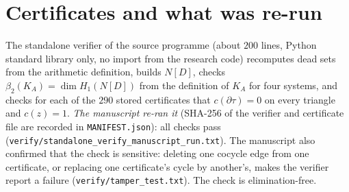 \section{Certificates and what was re-run}\label{sec:certificates}
The standalone verifier of the source programme (about $200$ lines, Python standard library only, no import from the research code) recomputes dead sets from the arithmetic definition, builds $N[D]$, checks $\beta_2(K_A)=\dim H_1(N[D])$ from the definition of $K_A$ for four systems, and checks for each of the $290$ stored certificates that $c(\partial\tau)=0$ on every triangle and $c(z)=1$. \emph{The manuscript re-ran it} (SHA-256 of the verifier and certificate file are recorded in \texttt{MANIFEST.json}): all checks pass (\texttt{verify/standalone\_verify\_manuscript\_run.txt}). The manuscript also confirmed that the check is sensitive: deleting one cocycle edge from one certificate, or replacing one certificate's cycle by another's, makes the verifier report a failure (\texttt{verify/tamper\_test.txt}). The check is elimination-free.
